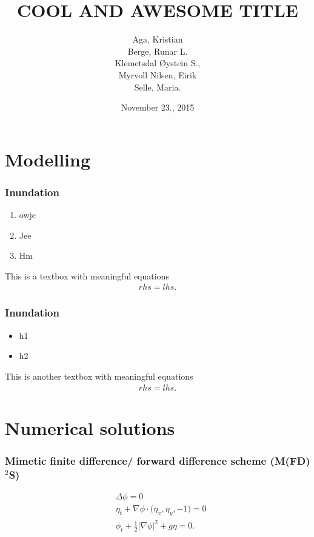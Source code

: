 \documentclass[screen]{beamer}
\title[Eksempelforedrag]%
{COOL AND AWESOME TITLE}
\author[aut]{Aga, Kristian \\ Berge, Runar L. \\ Klemetsdal Øystein S.,\\
	Myrvoll Nilsen, Eirik \\ Selle, Maria.
}
\date{November 23., 2015}
\begin{document}
\ntnutitlepage

\section*{Modelling}
\begin{frame}
    \frametitle[jaddA]{Inundation}
    \begin{enumerate}[\label = $\circ$]
        \item    owje
        \item    Jee
        \item    Hm
    \end{enumerate}
    \begin{block}{This is a textbox with meaningful equations}
        \begin{align*}
            rhs = lhs.
        \end{align*}
    \end{block}
\end{frame}

\begin{frame}
    \frametitle{Inundation}
    \begin{itemize}
        \pause
        \item    h1
        \pause
        \item    h2    
    \end{itemize}
    \pause
    \begin{block}{This is another textbox with meaningful equations}
        \begin{align*}
            rhs = lhs.
        \end{align*}
    \end{block}
\end{frame}

\section*{Numerical solutions}

\begin{frame}
    \frametitle{Mimetic finite difference/ forward difference scheme (M(FD)$^2$S)}
    \begin{align*}
        & \Delta \phi = 0 \\
        & \eta_t + \nabla\phi\cdot \big(\eta_x, \eta_y, - 1\big) = 0 \\
        & \phi_t + \frac{1}{2}|\nabla \phi |^2 + g\eta = 0.
    \end{align*}
\end{frame}
\end{document}
